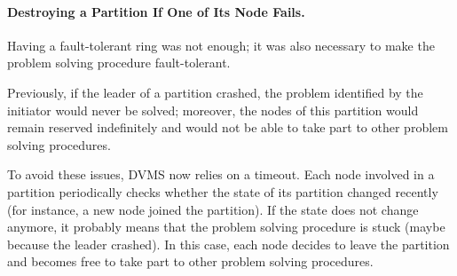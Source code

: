 \paragraph{Destroying a Partition If One of Its Node Fails.}

Having a fault-tolerant ring was not enough; it was also necessary to make the
problem solving procedure fault-tolerant.

Previously, if the leader of a partition crashed, the problem identified by the
initiator would never be solved; moreover, the nodes of this partition would
remain reserved indefinitely and would not be able to take part to other problem
solving procedures.

To avoid these issues, DVMS now relies on a timeout.  Each node involved in a
partition periodically checks whether the state of its partition changed
recently (for instance, a new node joined the partition).
%
If the state does not change anymore, it probably means that the problem solving
procedure is stuck (maybe because the leader crashed).
%
In this case, each node decides to leave the partition and becomes free to take
part to other problem solving procedures.

